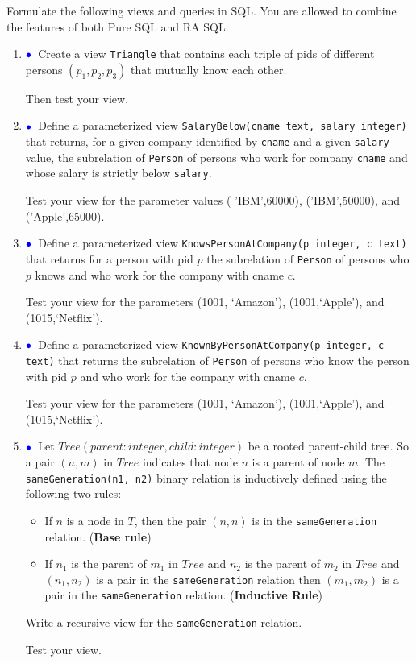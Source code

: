 \documentclass[11pt]{article}
\newcommand{\blue}[1]{{\color{blue}#1}}
\newcommand{\bluebullet}{$\blue{\bullet}$}
\begin{document}
Formulate the following views and queries in SQL. You are allowed to combine the features of both Pure SQL and RA SQL.

\begin{enumerate}[resume]

\item  \label{viewtriangle} \bluebullet\ 
Create a view {\tt Triangle} that contains each triple of pids of different persons $(p_1,p_2,p_3)$
that mutually know each other.   

Then test your view.
           
\item\label{viewone} \bluebullet\  Define a parameterized view {\tt SalaryBelow(cname text, salary integer)} that returns, for a given
company identified by {\tt cname} and a given {\tt salary} value, the subrelation of
{\tt Person} of persons who work for company {\tt cname} and whose salary is strictly below {\tt salary}.

Test your view for the parameter values ({ 'IBM'},60000), ({'IBM'},50000), and ({'Apple'},65000).

\item \bluebullet\ Define a parameterized view {\tt KnowsPersonAtCompany(p integer, c text)} that returns for a person with pid $p$ 
the subrelation of {\tt Person} of persons who $p$ knows and who work for the company with cname $c$.

Test your view for the parameters (1001, ‘Amazon’), (1001,‘Apple’), and (1015,‘Netflix’).

\item \bluebullet\ Define a parameterized view {\tt KnownByPersonAtCompany(p integer, c text)} that returns the subrelation of {\tt Person} of persons
who know the person with pid $p$ and who work for the company with cname $c$.

Test your view for the parameters (1001, ‘Amazon’), (1001,‘Apple’), and (1015,‘Netflix’).

\item \bluebullet\  Let $Tree(parent: integer, child: integer)$ be a rooted parent-child tree.   So a pair $(n,m)$ in $Tree$ indicates that node $n$ is a parent of node $m$.
The {\tt sameGeneration(n1, n2)} binary relation is inductively defined using the following two rules:
\begin{itemize}
\item If $n$ is a node in $T$, then the pair $(n,n)$ is in the {\tt sameGeneration} relation. ({\bf Base rule})
\item If $n_1$ is the parent of $m_1$ in $Tree$ and $n_2$ is the parent of $m_2$ in $Tree$ and 
$(n_1,n_2)$ is a pair in the {\tt sameGeneration} relation then $(m_1,m_2)$ is a pair in the {\tt sameGeneration} relation. ({\bf Inductive Rule})
\end{itemize}

Write a \blue{recursive view} for the {\tt sameGeneration} relation.

Test your view.
\end{enumerate}
\end{document}
